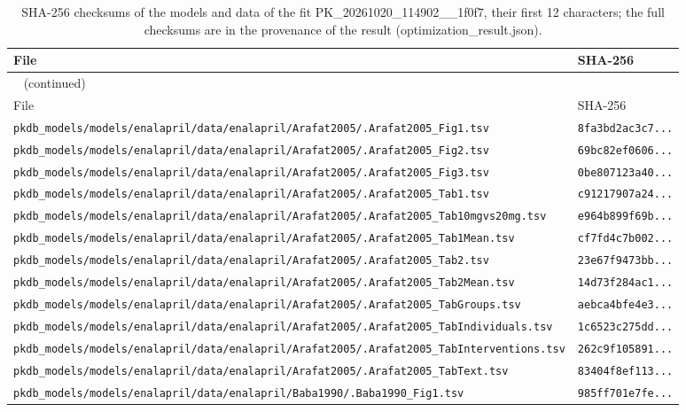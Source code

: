 \documentclass{article}
\begin{document}
\begin{longtable}{ll}
\caption{SHA-256 checksums of the models and data of the fit PK\_20261020\_114902\_\_1f0f7, their first 12 characters; the full checksums are in the provenance of the result (optimization\_result.json).}\label{tab:checksums:PK_20261020_114902__1f0f7} \\
\toprule
File & SHA-256 \\
\midrule
\endfirsthead
\multicolumn{2}{l}{\small\tablename~\thetable{} (continued)} \\
\toprule
File & SHA-256 \\
\midrule
\endhead
\bottomrule
\endlastfoot
\texttt{pkdb\_models/models/enalapril/data/enalapril/Arafat2005/.Arafat2005\_Fig1.tsv} & \texttt{8fa3bd2ac3c7...} \\
\texttt{pkdb\_models/models/enalapril/data/enalapril/Arafat2005/.Arafat2005\_Fig2.tsv} & \texttt{69bc82ef0606...} \\
\texttt{pkdb\_models/models/enalapril/data/enalapril/Arafat2005/.Arafat2005\_Fig3.tsv} & \texttt{0be807123a40...} \\
\texttt{pkdb\_models/models/enalapril/data/enalapril/Arafat2005/.Arafat2005\_Tab1.tsv} & \texttt{c91217907a24...} \\
\texttt{pkdb\_models/models/enalapril/data/enalapril/Arafat2005/.Arafat2005\_Tab10mgvs20mg.tsv} & \texttt{e964b899f69b...} \\
\texttt{pkdb\_models/models/enalapril/data/enalapril/Arafat2005/.Arafat2005\_Tab1Mean.tsv} & \texttt{cf7fd4c7b002...} \\
\texttt{pkdb\_models/models/enalapril/data/enalapril/Arafat2005/.Arafat2005\_Tab2.tsv} & \texttt{23e67f9473bb...} \\
\texttt{pkdb\_models/models/enalapril/data/enalapril/Arafat2005/.Arafat2005\_Tab2Mean.tsv} & \texttt{14d73f284ac1...} \\
\texttt{pkdb\_models/models/enalapril/data/enalapril/Arafat2005/.Arafat2005\_TabGroups.tsv} & \texttt{aebca4bfe4e3...} \\
\texttt{pkdb\_models/models/enalapril/data/enalapril/Arafat2005/.Arafat2005\_TabIndividuals.tsv} & \texttt{1c6523c275dd...} \\
\texttt{pkdb\_models/models/enalapril/data/enalapril/Arafat2005/.Arafat2005\_TabInterventions.tsv} & \texttt{262c9f105891...} \\
\texttt{pkdb\_models/models/enalapril/data/enalapril/Arafat2005/.Arafat2005\_TabText.tsv} & \texttt{83404f8ef113...} \\
\texttt{pkdb\_models/models/enalapril/data/enalapril/Baba1990/.Baba1990\_Fig1.tsv} & \texttt{985ff701e7fe...} \\

\end{longtable}
\end{document}
